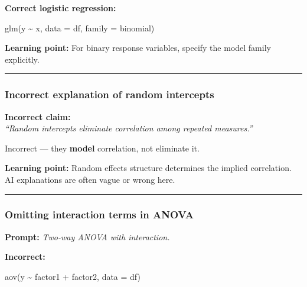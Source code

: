\documentclass[
  letterpaper,
  8pt,
  a4paper]{book}
\newenvironment{Shaded}{\begin{snugshade}}{\end{snugshade}}
\newcommand{\AttributeTok}[1]{\textcolor[rgb]{0.40,0.45,0.13}{#1}}
\newcommand{\FunctionTok}[1]{\textcolor[rgb]{0.28,0.35,0.67}{#1}}
\newcommand{\NormalTok}[1]{\textcolor[rgb]{0.00,0.23,0.31}{#1}}
\newcommand{\SpecialCharTok}[1]{\textcolor[rgb]{0.37,0.37,0.37}{#1}}
\begin{document}
\textbf{Correct logistic regression:}

\begin{Shaded}
\begin{Highlighting}[]
\FunctionTok{glm}\NormalTok{(y }\SpecialCharTok{\textasciitilde{}}\NormalTok{ x, }\AttributeTok{data =}\NormalTok{ df, }\AttributeTok{family =}\NormalTok{ binomial)}
\end{Highlighting}
\end{Shaded}

\textbf{Learning point:} For binary response variables, specify the
model family explicitly.

\begin{center}\rule{0.5\linewidth}{0.5pt}\end{center}

\subsubsection*{Incorrect explanation of random
intercepts}\label{incorrect-explanation-of-random-intercepts}

\textbf{Incorrect claim:}\\
\emph{``Random intercepts eliminate correlation among repeated
measures.''}

Incorrect --- they \textbf{model} correlation, not eliminate it.

\textbf{Learning point:} Random effects structure determines the implied
correlation. AI explanations are often vague or wrong here.

\begin{center}\rule{0.5\linewidth}{0.5pt}\end{center}

\subsubsection*{Omitting interaction terms in
ANOVA}\label{omitting-interaction-terms-in-anova}

\textbf{Prompt:} \emph{Two-way ANOVA with interaction.}

\textbf{Incorrect:}

\begin{Shaded}
\begin{Highlighting}[]
\FunctionTok{aov}\NormalTok{(y }\SpecialCharTok{\textasciitilde{}}\NormalTok{ factor1 }\SpecialCharTok{+}\NormalTok{ factor2, }\AttributeTok{data =}\NormalTok{ df)}
\end{Highlighting}
\end{Shaded}
\end{document}
